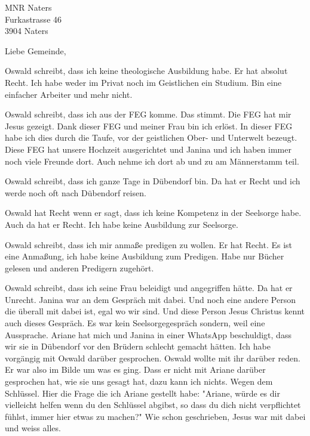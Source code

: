 \documentclass[private]{scrlttr2}
\begin{document}


\begin{letter}{
  MNR Naters \\
  Furkastrasse 46 \\
  3904 Naters
}

\opening{Liebe Gemeinde,}
Oswald schreibt, dass ich keine theologische Ausbildung habe. Er hat absolut Recht. Ich habe weder im Privat noch im Geistlichen ein Studium. Bin eine einfacher Arbeiter und mehr nicht.

Oswald schreibt, dass ich aus der FEG komme. Das stimmt. Die FEG hat mir Jesus gezeigt. Dank dieser FEG und meiner Frau bin ich erlöst. In dieser FEG habe ich dies durch die Taufe, vor der geistlichen Ober- und Unterwelt bezeugt. Diese FEG hat unsere Hochzeit ausgerichtet und Janina und ich haben immer noch viele Freunde dort. Auch nehme ich dort ab und zu am Männerstamm teil.

Oswald schreibt, dass ich ganze Tage in Dübendorf bin. Da hat er Recht und ich werde noch oft nach Dübendorf reisen.

Oswald hat Recht wenn er sagt, dass ich keine Kompetenz in der Seelsorge habe. Auch da hat er Recht. Ich habe keine Ausbildung zur Seelsorge.

Oswald schreibt, dass ich mir anmaße predigen zu wollen. Er hat Recht. Es ist eine Anmaßung, ich habe keine Ausbildung zum Predigen. Habe nur Bücher gelesen und anderen Predigern zugehört.

Oswald schreibt, dass ich seine Frau beleidigt und angegriffen hätte. Da hat er Unrecht. Janina war an dem Gespräch mit dabei. Und noch eine andere Person die überall mit dabei ist, egal wo wir sind. Und diese Person Jesus Christus kennt auch dieses Gespräch. Es war kein Seelsorgegespräch sondern, weil eine Aussprache. Ariane hat mich und Janina in einer WhatsApp beschuldigt, dass wir sie in Dübendorf vor den Brüdern schlecht gemacht hätten. Ich habe vorgängig mit Oswald darüber gesprochen. Oswald wollte mit ihr darüber reden. Er war also im Bilde um was es ging. Dass er nicht mit Ariane darüber gesprochen hat, wie sie uns gesagt hat, dazu kann ich nichts. Wegen dem Schlüssel. Hier die Frage die ich Ariane gestellt habe: "Ariane, würde es dir vielleicht helfen wenn du den Schlüssel abgibst, so dass du dich nicht verpflichtet fühlst, immer hier etwas zu machen?" Wie schon geschrieben, Jesus war mit dabei und weiss alles. 


\end{letter}
\end{document}
